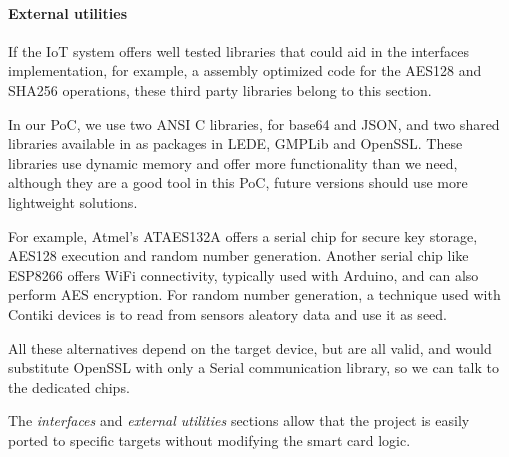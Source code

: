 \paragraph{External utilities}\hfil

If the IoT system offers well tested libraries that could aid in the interfaces implementation, for example, a assembly optimized code for the AES128 and SHA256 operations, these third party libraries belong to this section.

In our PoC, we use two ANSI C libraries, for base64 and JSON, and two shared libraries available in as packages in LEDE, GMPLib and OpenSSL. These libraries use dynamic memory and offer more functionality than we need, although they are a good tool in this PoC, future versions should use more lightweight solutions.

For example, Atmel's ATAES132A \citep{ATAES132A}
offers a serial chip for secure key storage, AES128 execution and random number generation. Another serial chip like ESP8266 offers WiFi connectivity, typically used with Arduino, and can also perform AES encryption. For random number generation, a technique used with Contiki devices is to read from sensors aleatory data and use it as seed.

All these alternatives depend on the target device, but are all valid, and would substitute OpenSSL with only a Serial communication library, so we can talk to the dedicated chips.

\hfil

The \textit{interfaces} and \textit{external utilities} sections  allow that the project is easily ported to specific targets without modifying the smart card logic.



